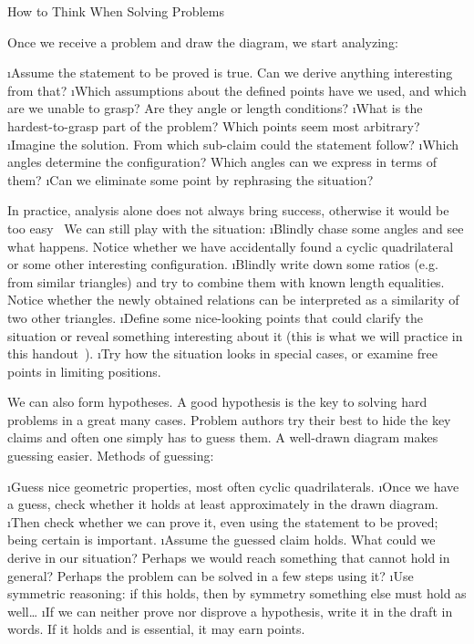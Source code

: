 \secc How to Think When Solving Problems

Once we receive a problem and draw the diagram, we start analyzing:

\begitems
\i Assume the statement to be proved is true. Can we derive anything interesting from that?
\i Which assumptions about the defined points have we used, and which are we unable to grasp? Are they angle or length conditions?
\i What is the hardest-to-grasp part of the problem? Which points seem most arbitrary?
\i Imagine the solution. From which sub-claim could the statement follow?
\i Which angles determine the configuration? Which angles can we express in terms of them?
\i Can we eliminate some point by rephrasing the situation?
\enditems

In practice, analysis alone does not always bring success, otherwise it would be too easy~\SlightSmile{} We can still play with the situation:
\begitems
\i Blindly chase some angles and see what happens. Notice whether we have accidentally found a cyclic quadrilateral or some other interesting configuration.
\i Blindly write down some ratios (e.g. from similar triangles) and try to combine them with known length equalities. Notice whether the newly obtained relations can be interpreted as a similarity of two other triangles.
\i Define some nice-looking points that could clarify the situation or reveal something interesting about it (this is what we will practice in this handout~\SlightSmile{}).
\i Try how the situation looks in special cases, or examine free points in limiting positions.
\enditems

We can also form hypotheses. A good hypothesis is the key to solving hard problems in a great many cases. Problem authors try their best to hide the key claims and often one simply has to guess them. A well-drawn diagram makes guessing easier. Methods of guessing:

\begitems
\i Guess nice geometric properties, most often cyclic quadrilaterals.
\i Once we have a guess, check whether it holds at least approximately in the drawn diagram.
\i Then check whether we can prove it, even using the statement to be proved; being certain is important.
\i Assume the guessed claim holds. What could we derive in our situation? Perhaps we would reach something that cannot hold in general? Perhaps the problem can be solved in a few steps using it?
\i Use symmetric reasoning: if this holds, then by symmetry something else must hold as well\dots
\i If we can neither prove nor disprove a hypothesis, write it in the draft in words. If it holds and is essential, it may earn points.
\enditems

